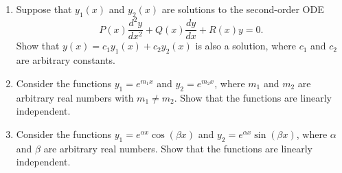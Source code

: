 \documentclass[12pt]{article}
\newif\ifans
\begin{document}
\begin{enumerate}

\item Suppose that $y_1(x)$ and $y_2(x)$ are solutions to the second-order ODE $$P(x)\frac{d^2y}{dx^2}+Q(x)\frac{dy}{dx}+R(x)y=0.$$  Show that $y(x)=c_1y_1(x)+c_2y_2(x)$ is also a solution, where $c_1$ and $c_2$ are arbitrary constants.

\ifans{\fbox{\parbox{1\linewidth}{To simplify notation, we will omit the ``of $x$" from the functions $y, y_1,$ and $y_2$ and also write derivatives in prime notation.  Now, since $y_1$ and $y_2$ are solutions
to the ODE, they satisfy it, i.e. 
\begin{equation}P(x)y_1''+Q(x)y_1'+R(x)y_1 = 0 \text{ and } P(x)y_2''+Q(x)y_2'+R(x)y_2 = 0. \tag{*} 
\end{equation}  Now we show that $y=c_1y_1+c_2y_2$ also satisfies the ODE: 
\begin{align*} P(x)y''+Q(x)y'+R(x)y&=P(x)(c_1y_1+c_2y_2)''+Q(x)(c_1y_1+c_2y_2)' + R(x)(c_1y_1+c_2y_2) \\
&=P(x)(c_1y_1''+c_2y_2'')+Q(x)(c_1y_1'+c_2y_2') + R(x)(c_1y_1+c_2y_2) \\
&=c_1\left[P(x)y_1''+Q(x)y_1'+R(x)y_1\right] +c_2\left[P(x)y_2''+Q(x)y_2'+R(x)y_2\right] \\
&=c_1(0) + c_2(0) \text{ by (*) } \\
&=0. \end{align*} Thus $y=c_1y_1+c_2y_2$ is a solution to the ODE. }}} \fi

\item Consider the functions $y_1=e^{m_1x}$ and $y_2=e^{m_2x}$, where $m_1$ and $m_2$ are arbitrary real numbers with $m_1 \neq m_2$.  Show that the functions are linearly independent.

\ifans{\fbox{\parbox{1\linewidth}{If $y_1$ and $y_2$ were not linearly independent, then one would be a constant multiple of the other, i.e. $e^{m_1x}=ke^{m_2x}$ for {\bf all} $x$.  In particular, for $x=0$
we would have $e^{(m_1)(0)}=ke^{(m_2)(0)}$, or $1=k$.  But then  $e^{m_1x}=ke^{m_2x}$ becomes $e^{m_1x}=e^{m_2x}$, which is impossible since $m_1 \neq m_2$.  Thus, $y_1=e^{m_1x}$ and $y_2=e^{m_2x}$ are linearly independent.}}} \fi

\item Consider the functions $y_1=e^{\alpha x}\cos\left({\beta x}\right)$ and $y_2=e^{\alpha x}\sin\left({\beta x}\right)$, where $\alpha$ and $\beta$ are arbitrary real numbers.  
Show that the functions are linearly independent.

\ifans{\fbox{\parbox{1\linewidth}{If $y_1$ and $y_2$ were not linearly independent, then one would be a constant multiple of the other, i.e. 
$e^{\alpha x}\cos\left({\beta x}\right)=ke^{\alpha x}\sin\left({\beta x}\right)$ for {\bf all} $x$.  In particular, for $x=0$
we would have $0=1$, which is absurd.  Thus, $y_1=e^{\alpha x}\cos\left({\beta x}\right)$ and $y_2=e^{\alpha x}\sin\left({\beta x}\right)$ are linearly independent.}}} \fi

\end{enumerate}
\end{document}
